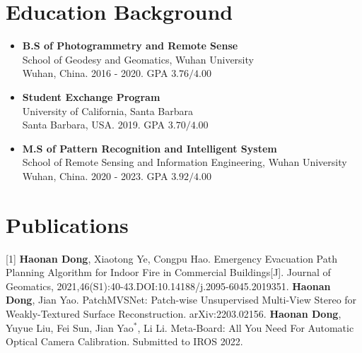 \documentclass[a4paper]{article}
\begin{document}
\section{Education Background}
\vspace{-0.5em}
\begin{itemize}[itemsep = -0.5em,topsep = 0em]
      \item \textbf{B.S of Photogrammetry and Remote Sense}
            \\ School of Geodesy and Geomatics, Wuhan University\\ Wuhan, China. 2016 - 2020. GPA $3.76/4.00$
      \item \textbf{Student Exchange Program}
            \\ University of California, Santa Barbara\\ Santa Barbara, USA. 2019. GPA $3.70/4.00$
      \item \textbf{M.S of Pattern Recognition and Intelligent System}
            \\ School of Remote Sensing and Information Engineering, Wuhan University\\ Wuhan, China. 2020 - 2023. GPA $3.92/4.00$
\end{itemize}


\section{Publications}
\vspace{-0.5em}
[1] \textbf{Haonan Dong}, Xiaotong Ye, Congpu Hao. Emergency Evacuation Path Planning Algorithm for Indoor Fire in Commercial Buildings[J]. Journal of Geomatics, 2021,46(S1):40-43.DOI:10.14188/j.2095-6045.2019351.
\newline
[2] \textbf{Haonan Dong}, Jian Yao. PatchMVSNet: Patch-wise Unsupervised Multi-View Stereo for
Weakly-Textured Surface Reconstruction. arXiv:2203.02156.
\newline
[3] \textbf{Haonan Dong}, Yuyue Liu, Fei Sun, Jian Yao$^{*}$, Li Li. Meta-Board: All You Need For Automatic Optical Camera Calibration. Submitted to IROS 2022.
\end{document}
